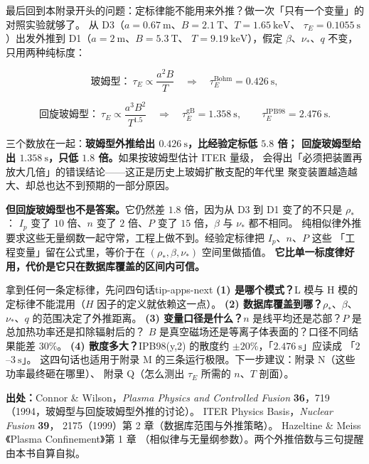 最后回到本附录开头的问题：定标律能不能用来外推？做一次「只有一个变量」的对照实验就够了。
从 D3（$a=0.67\ \mathrm{m}$、$B=2.1\ \mathrm{T}$、$T=1.65\ \mathrm{keV}$、
$\tau_E=0.1055\ \mathrm{s}$）出发外推到 D1（$a=2\ \mathrm{m}$、$B=5.3\ \mathrm{T}$、
$T=9.19\ \mathrm{keV}$），假定 $\beta$、$\nu_\ast$、$q$ 不变，只用两种纯标度：

\begin{equation}
\text{玻姆型：}\ \tau_E\propto\frac{a^2B}{T}
\quad\Longrightarrow\quad
\tau_E^{\mathrm{Bohm}}=0.426\ \mathrm{s},
\label{eq:app-s-extrapb}
\end{equation}

\begin{equation}
\text{回旋玻姆型：}\ \tau_E\propto\frac{a^3B^2}{T^{1.5}}
\quad\Longrightarrow\quad
\tau_E^{\mathrm{gB}}=1.358\ \mathrm{s},
\qquad
\tau_E^{\mathrm{IPB98}}=2.476\ \mathrm{s}.
\label{eq:app-s-extrapgb}
\end{equation}

三个数放在一起：\textbf{玻姆型外推给出 $0.426\ \mathrm{s}$，比经验定标低 $5.8$ 倍；
回旋玻姆型给出 $1.358\ \mathrm{s}$，只低 $1.8$ 倍。}如果按玻姆型估计 ITER 量级，
会得出「必须把装置再放大几倍」的错误结论——这正是历史上玻姆扩散支配的年代里
聚变装置越造越大、却总也达不到预期的一部分原因。

\textbf{但回旋玻姆型也不是答案。}它仍然差 $1.8$ 倍，因为从 D3 到 D1 变了的不只是 $\rho_\ast$：
$I_p$ 变了 $10$ 倍、$n$ 变了 $2$ 倍、$P$ 变了 $15$ 倍，$\beta$ 与 $\nu_\ast$ 都不相同。
纯相似律外推要求这些无量纲数一起守常，工程上做不到。经验定标律把 $I_p$、$n$、$P$ 这些
「工程变量」留在公式里，等价于在 $(\rho_\ast,\beta,\nu_\ast)$ 空间里做插值。
\textbf{它比单一标度律好用，代价是它只在数据库覆盖的区间内可信。}

\begin{tip}{拿到任何一条定标律，先问四句话}{tip-apps-next}
\textbf{(1) 是哪个模式？}L 模与 H 模的定标律不能混用（$H$ 因子的定义就依赖这一点）。
\textbf{(2) 数据库覆盖到哪？}$\rho_\ast$、$\beta$、$\nu_\ast$、$q$ 的范围决定了外推距离。
\textbf{(3) 变量口径是什么？}$n$ 是线平均还是芯部？$P$ 是总加热功率还是扣除辐射后的？
$B$ 是真空磁场还是等离子体表面的？口径不同结果能差 $30\%$。
\textbf{(4) 散度多大？}IPB98(y,2) 的散度约 $\pm20\%$，「$2.476\ \mathrm{s}$」应读成
「$2$--$3\ \mathrm{s}$」。
这四句话也适用于附录 M 的三条运行极限。下一步建议：附录 N（这些功率最终砸在哪里）、
附录 Q（怎么测出 $\tau_E$ 所需的 $n$、$T$ 剖面）。
\end{tip}

{\footnotesize
\textbf{出处：}Connor \& Wilson，\textit{Plasma Physics and Controlled Fusion} \textbf{36}，719
（1994，玻姆型与回旋玻姆型外推的讨论）。
ITER Physics Basis，\textit{Nuclear Fusion} \textbf{39}，
2175（1999）第 2 章（数据库范围与外推策略）。
Hazeltine \& Meiss《Plasma Confinement》第 1 章
（相似律与无量纲参数）。两个外推倍数与三句提醒由本书自算自拟。
}


